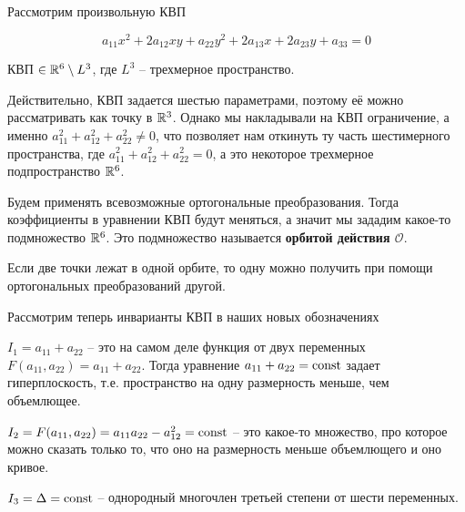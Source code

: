 
Рассмотрим произвольную КВП

\[a_{11} x^2 + 2a_{12}xy + a_{22}y^2 + 2a_{13}x + 2a_{23}y + a_{33} = 0\]

\begin{Prop}
	КВП $\in \mathbb{R}^6 \setminus L^3$, где $L^3$ -- трехмерное пространство. 

	Действительно, КВП задается шестью параметрами, поэтому её можно рассматривать как точку в $\mathbb{R}^3$.
	Однако мы накладывали на КВП ограничение, а именно $a_{11}^2 + a_{12}^2 + a_{22}^2 \neq 0$, что позволяет нам откинуть ту часть шестимерного пространства, где $a_{11}^2 + a_{12}^2 + a_{22}^2 = 0$, 
	а это некоторое трехмерное подпространство $\mathbb{R}^6$.
\end{Prop}

\begin{Def}
	Будем применять всевозможные ортогональные преобразования. Тогда коэффициенты в уравнении КВП будут меняться, а значит мы зададим какое-то подмножество $\mathbb{R}^6$.
	Это подмножество называется \textbf{орбитой действия $\mathcal{O}$}.
\end{Def}

\begin{Rem}
	Если две точки лежат в одной орбите, то одну можно получить при помощи ортогональных преобразований другой.
\end{Rem}

Рассмотрим теперь инварианты КВП в наших новых обозначениях

\begin{MyItemize}
	\item $I_1 = a_{11} + a_{22}$ -- это на самом деле функция от двух переменных $F(a_{11}, a_{22}) = a_{11} + a_{22}$. Тогда уравнение $a_{11} + a_{22} = \operatorname{const}$ задает гиперплоскость, 
	т.е. пространство на одну размерность меньше, чем объемлющее.

	\item $I_2 = F(a_{11}, a_{22}) = a_{11} a_{22} - a_{12}^2 = \operatorname{const}$ -- это какое-то множество, про которое можно сказать только то, что оно на размерность меньше объемлющего и оно кривое.
	\item $I_3 = \Delta = \operatorname{const}$ -- однородный многочлен третьей степени от шести переменных.
\end{MyItemize}

\begin{figure}[h]
	\centering
	\def\svgwidth{.35\columnwidth}
	
\end{figure}

